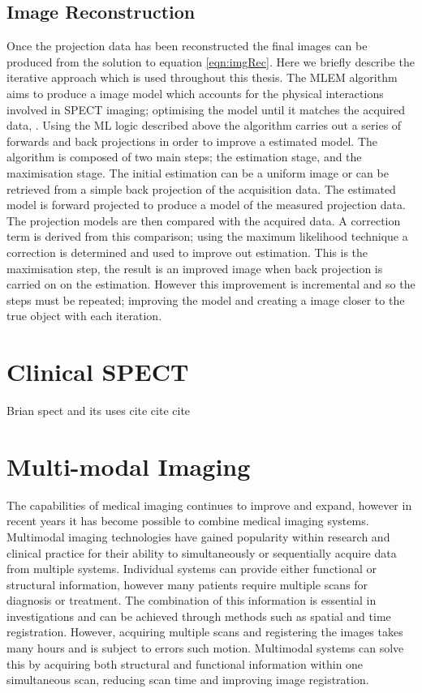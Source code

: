 \subsection{Image Reconstruction}
Once the projection data has been reconstructed the final images can be produced from the solution to equation \ref{eqn:imgRec}. Here we briefly describe the iterative approach which is used throughout this thesis. The \acrlong{MLEM} algorithm aims to produce a image model which accounts for the physical interactions involved in \acrshort{SPECT} imaging; optimising the model until it matches the acquired data, \cite{4307558}. Using the \acrshort{ML} logic described above the algorithm carries out a series of forwards and back projections in order to improve a estimated model. The algorithm is composed of two main steps; the estimation stage, and the maximisation stage. The initial estimation can be a uniform image or can be retrieved from a simple back projection of the acquisition data. The estimated model is forward projected to produce a model of the measured projection data. The projection models are then compared with the acquired data. A correction term is derived from this comparison; using the maximum likelihood technique a correction is determined and used to improve out estimation. This is the maximisation step, the result is an improved image when back projection is carried on on the estimation. However this improvement is incremental and so the steps must be repeated; improving the model and creating a image closer to the true object with each iteration.  

\section{Clinical SPECT}
Brian spect and its uses cite cite cite 

\section{Multi-modal Imaging} %
The capabilities of medical imaging continues to improve and expand, however in recent years it has become possible to combine medical imaging systems. Multimodal imaging technologies have gained popularity within research and clinical practice for their ability to simultaneously or sequentially acquire data from multiple systems. Individual systems can provide either functional or structural information, however many patients require multiple scans for diagnosis or treatment. The combination of this information is essential in investigations and can be achieved through methods such as spatial and time registration. However, acquiring multiple scans and registering the images takes many hours and is subject to errors such motion. Multimodal systems can solve this by acquiring both structural and functional information within one simultaneous scan, reducing scan time and improving image registration. 

